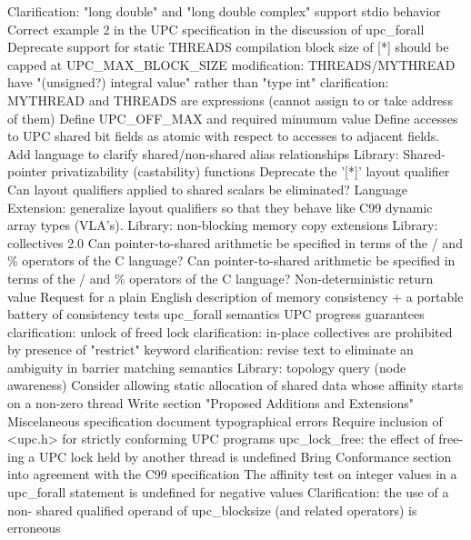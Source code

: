 {      \or %
        Clarification: "long double" and "long double complex" support
      \or %
        stdio behavior
      \or %
        Correct example 2 in the UPC specification in the discussion of upc\_forall
      \or %
        Deprecate support for static THREADS compilation
      \or %
        block size of [*] should be capped at UPC\_MAX\_BLOCK\_SIZE
      \or %
        modification: THREADS/MYTHREAD have "(unsigned?) integral value" rather than "type int"
      \or %
        clarification: MYTHREAD and THREADS are expressions (cannot assign to or take address of them)
      \or %
        Define UPC\_OFF\_MAX and required minumum value
      \or %
        Define accesses to UPC shared bit fields as atomic with respect to accesses to adjacent fields.
      \or %
        Add language to clarify shared/non-shared alias relationships
      \or %
        Library: Shared-pointer privatizability (castability) functions
      \or %
        Deprecate the '[*]' layout qualifier
      \or %
        Can layout qualifiers applied to shared scalars be eliminated?
      \or %
        Language Extension:  generalize layout qualifiers so that they behave like C99 dynamic array types (VLA's).
      \or %
        Library: non-blocking memory copy extensions
      \or %
        Library: collectives 2.0
      \or %
        Can pointer-to-shared arithmetic be specified in terms of the / and \% operators of the C language?
      \or %
        Can pointer-to-shared arithmetic be specified in terms of the / and \% operators of the C language?
      \or %
        Non-deterministic return value
      \or %
        Request for a plain English description of memory consistency + a portable battery of consistency tests
      \or %
        upc\_forall semantics
      \or %
        UPC progress guarantees
      \or %
        clarification: unlock of freed lock
      \or %
        clarification: in-place collectives are prohibited by presence of "restrict" keyword
      \or %
        clarification: revise text to eliminate an ambiguity in barrier matching semantics
      \or %
        Library: topology query (node awareness)
      \or %
        Consider allowing static allocation of shared data whose affinity starts on a non-zero thread
      \or %
        Write section "Proposed Additions and Extensions"
      \or %
        Miscelaneous specification document typographical errors
      \or %
        Require inclusion of <upc.h> for strictly conforming UPC programs
      \or %
        upc\_lock\_free: the effect of free-ing a UPC lock held by another thread is undefined
      \or %
        Bring Conformance section into agreement with the C99 specification
      \or %
        The affinity test on integer values in a upc\_forall statement is undefined for negative values
      \or %
        Clarification: the use of a non- shared qualified operand of upc\_blocksize (and related operators) is erroneous
    \else
        \empty
    \fi
}
